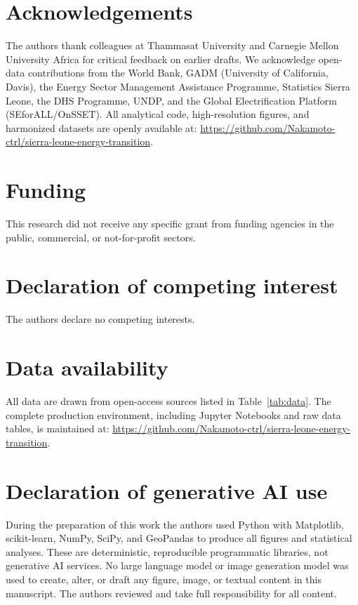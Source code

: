 \documentclass[preprint,12pt]{elsarticle}
\begin{document}
\section*{Acknowledgements}
The authors thank colleagues at Thammasat University and
Carnegie Mellon University Africa for critical feedback on
earlier drafts. We acknowledge open-data contributions
from the World Bank, GADM (University of California, Davis),
the Energy Sector Management Assistance Programme, Statistics
Sierra Leone, the DHS Programme, UNDP, and the Global
Electrification Platform (SEforALL/OnSSET). All analytical code, 
high-resolution figures, and harmonized datasets are openly 
available at: \url{https://github.com/Nakamoto-ctrl/sierra-leone-energy-transition}.

\section*{Funding}
This research did not receive any specific grant from
funding agencies in the public, commercial, or
not-for-profit sectors.

\section*{Declaration of competing interest}
The authors declare no competing interests.

\section*{Data availability}
All data are drawn from open-access sources listed in
Table~\ref{tab:data}. The complete production environment, including 
Jupyter Notebooks and raw data tables, is maintained at: 
\url{https://github.com/Nakamoto-ctrl/sierra-leone-energy-transition}.

\section*{Declaration of generative AI use}
During the preparation of this work the authors used Python
with Matplotlib, scikit-learn, NumPy, SciPy, and GeoPandas
to produce all figures and statistical analyses. These are
deterministic, reproducible programmatic libraries, not
generative AI services. No large language model or image
generation model was used to create, alter, or draft any
figure, image, or textual content in this manuscript.
The authors reviewed and take full responsibility for all content.



\end{document}
